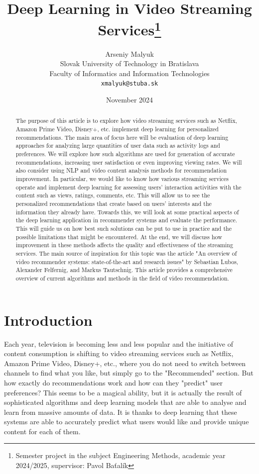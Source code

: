 \documentclass[12pt,english,a4paper]{article}
\title{Deep Learning in Video Streaming Services\thanks{Semester project in the subject Engineering Methods, academic year 2024/2025, supervisor: Pavol Baťalík}}
\author{Arseniy Malyuk\\[2pt]
	{\small Slovak University of Technology in Bratislava}\\
	{\small Faculty of Informatics and Information Technologies}\\
	{\small \texttt{xmalyuk@stuba.sk}}
	}
\date{\small November 2024}
\begin{document}
\maketitle

\begin{abstract}

    The purpose of this article is to explore how video streaming services such as Netflix, Amazon Prime Video, Disney+, etc. implement deep learning for personalized recommendations. The main area of focus here will be evaluation of deep learning approaches for analyzing large quantities of user data such as activity logs and preferences. We will explore how such algorithms are used for generation of accurate recommendations, increasing user satisfaction or even improving viewing rates. We will also consider using NLP and video content analysis methods for recommendation improvement. In particular, we would like to know how various streaming services operate and implement deep learning for assessing users’ interaction activities with the content such as views, ratings, comments, etc. This will allow us to see the personalized recommendations that create based on users’ interests and the information they already have. Towards this, we will look at some practical aspects of the deep learning application in recommender systems and evaluate the performance. This will guide us on how best such solutions can be put to use in practice and the possible limitations that might be encountered. At the end, we will discuss how improvement in these methods affects the quality and effectiveness of the streaming services. The main source of inspiration for this topic was the article "An overview of video recommender systems: state-of-the-art and research issues" \cite{Lubos2023} by Sebastian Lubos, Alexander Felfernig, and Markus Tautschnig. This article provides a comprehensive overview of current algorithms and methods in the field of video recommendation.
    
\end{abstract}

\newpage

\section{Introduction}

\hspace*{2em}Each year, television is becoming less and less popular and the initiative of content consumption is shifting to video streaming services such as Netflix, Amazon Prime Video, Disney+, etc., where you do not need to switch between channels to find what you like, but simply go to the "Recommended" section. But how exactly do recommendations work and how can they "predict" user preferences? This seems to be a magical ability, but it is actually the result of sophisticated algorithms and deep learning models that are able to analyse and learn from massive amounts of data. It is thanks to deep learning that these systems are able to accurately predict what users would like and provide unique content for each of them.
\end{document}

